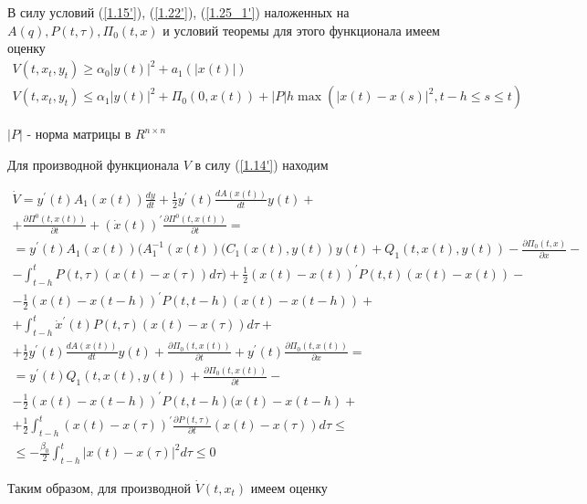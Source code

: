 В силу условий (\ref{1.15'}), (\ref{1.22'}), (\ref{1.25_1'}) наложенных на $A(q), P(t, \tau), \Pi_0(t, x)$ и условий теоремы для этого функционала имеем оценку
$$
\begin{array}{c}
	V(t, x_t, y_t) \ge \alpha_0 \left| y(t) \right| ^2 + a_1 (\left| x(t) \right|)\\
	V(t, x_t, y_t) \le \alpha_1 \left| y(t) \right| ^2 + \Pi_0 (0, x(t)) + \left| P \right| h \max (\left| x(t) - x(s) \right| ^2, t-h \le s \le t)
\end{array}
$$

$\left| P \right|$ - норма матрицы в $R^{n \times n}$

Для производной функционала $V$ в силу (\ref{1.14'}) находим

$$
\begin{array}{c}
\displaystyle \dot V = y^{'} (t) A_1 (x(t)) \frac{dy}{dt} + \frac12 y^{'} (t) \frac{d A(x(t))}{dt} y(t) +\\+
\displaystyle \frac{\partial \Pi^0 (t, x(t))}{\partial t} + (\dot x (t))^{'} \frac{\partial \Pi^0 (t, x(t))}{\partial t} =\\
\displaystyle = y^{'} (t) A_1 (x(t)) ( A_1^{-1} (x(t)) (C_1 (x(t), y(t)) y(t) + Q_1 (t, x(t), y(t)) - \frac{\partial \Pi_0 (t, x)}{\partial x} -\\
\displaystyle - \int_{t - h}^{t} P(t, \tau) (x(t) - x(\tau)) d \tau) + \frac12 (x(t) - x(t))^{'} P(t, t) (x(t) - x(t)) -\\
\displaystyle - \frac12 (x(t) - x(t - h))^{'} P(t, t - h) (x(t) - x(t - h)) +\\
\displaystyle + \int_{t - h}^{t} \dot x^{'} (t) P(t, \tau) (x(t) - x(\tau)) d \tau +\\
\displaystyle + \frac12 y^{'}(t) \frac{d A(x(t))}{dt} y(t) + \frac{\partial \Pi_0 (t, x(t))}{\partial t} + y^{'}(t) \frac{\partial \Pi_0 (t, x(t))}{\partial x} =\\
\displaystyle = y^{'} (t) Q_1 (t, x(t), y(t)) + \frac{\partial \Pi_0 (t, x(t))}{\partial t} -\\
\displaystyle - \frac12 (x(t) - x(t - h))^{'} P (t, t - h) (x(t) - x(t - h) +\\
\displaystyle + \frac12 \int_{t - h}^{t} (x(t) - x(\tau))^{'} \frac{\partial P(t, \tau)}{\partial t} (x(t) - x(\tau)) d \tau \le\\
\displaystyle \le - \frac{\beta_0}{2} \int_{t-h}^{t} \left| x(t) - x(\tau) \right| ^2 d \tau \le 0
\end{array}
$$

Таким образом, для производной $\dot V(t, x_t)$ имеем оценку

